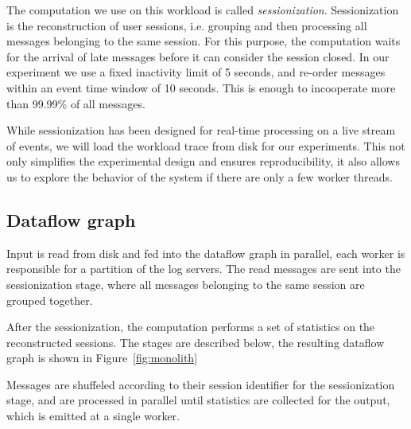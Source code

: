 The computation we use on this workload is called \emph{sessionization}. Sessionization
is the reconstruction of user sessions, i.e. grouping and then processing all
messages belonging to the same session. For this purpose, the computation waits for
the arrival of late messages before it can consider the session closed. In
our experiment we use a fixed inactivity limit of 5 seconds, and re-order messages
within an event time window of 10 seconds. This is enough to incooperate more
than 99.99\% of all messages. 

While sessionization has been designed for real-time processing on a live
stream of events, we will load the workload trace from disk for our experiments.
This not only simplifies the experimental design and ensures reproducibility,
it also allows us to explore the behavior of the system if there are only a
few worker threads.

\subsection{Dataflow graph}

Input is read from disk and fed into the dataflow graph in parallel, each worker
is responsible for a partition of the log servers. The read messages are sent
into the sessionization stage, where all messages belonging to the same session
are grouped together.

After the sessionization, the computation performs a set of statistics on the
reconstructed sessions. The stages are described below, the resulting dataflow
graph is shown in Figure~\ref{fig:monolith}

Messages are shuffeled according to their session identifier for the
sessionization stage, and are processed in parallel until statistics are
collected for the output, which is emitted at a single worker. 

